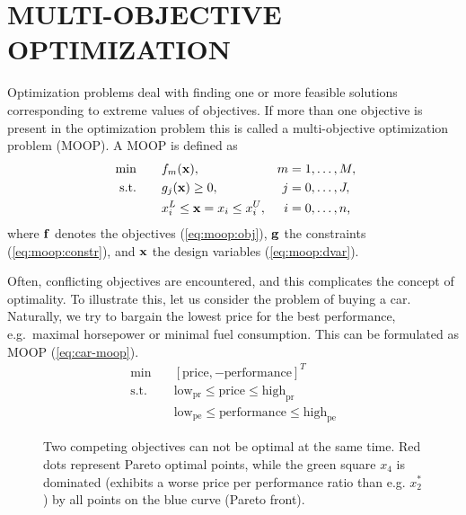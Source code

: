 \documentclass[%
reprint,
amsmath,amssymb,
aps,
prstab,
]{revtex4-1}
\begin{document}
\section{MULTI-OBJECTIVE OPTIMIZATION} \label{sec:optimization}

Optimization problems deal with finding one or more feasible solutions
  corresponding to extreme values of objectives.
If more than one objective is present in the optimization problem this is called
  a multi-objective optimization problem (MOOP).
A MOOP is defined as
%
\begin{align}
  \text{ min} \quad & \quad f_m({\bf x}), ~& m &= 1, \dots, M, \label{eq:moop:obj}\\
  \text{s.t.} \quad & \quad g_j({\bf x}) \geq 0, & j &= 0, \dots, J,
  \label{eq:moop:constr}\\
  \quad & \quad  x_i^L \leq {\bf x}=x_i \leq x_i^U,& i &=0, \dots, n
  \label{eq:moop:dvar} \text{,}
\end{align}
%
where $\bf f$ denotes the objectives (\ref{eq:moop:obj}),
  $\bf g$ the constraints (\ref{eq:moop:constr}),
  and $\bf x$ the design variables (\ref{eq:moop:dvar}).

Often, conflicting objectives are encountered, and this complicates the concept of
  optimality.
To illustrate this, let us consider the problem of buying a car.
Naturally, we try to bargain the lowest price for the best performance,
  e.g.\ maximal horsepower or minimal fuel consumption.
This can be formulated as MOOP (\ref{eq:car-moop}).
%
\begin{equation}
  \begin{array}{cl}
  \min          & \quad \left[ \text{price}, -\text{performance} \right]^T \\
    \text{s.t.} & \quad \text{low}_\text{pr} \leq \text{price} \leq \text{high}_\text{pr}\\
                & \quad \text{low}_\text{pe} \leq \text{performance} \leq \text{high}_\text{pe}
  \end{array}
  \label{eq:car-moop}
\end{equation}

\begin{figure}
  \begin{center}
    \begin{tikzpicture}[scale=1.3, transform shape]
      
    \end{tikzpicture}
  \end{center}
  \caption{Two competing objectives can not be optimal at the same time.
    Red dots represent Pareto optimal points, while the green square $x_4$ is
    dominated (exhibits a worse price per performance ratio than e.g. $x_2^*$)
    by all points on the blue curve (Pareto front).
  }
  \label{fig:tradeoff}
\end{figure}
\end{document}

